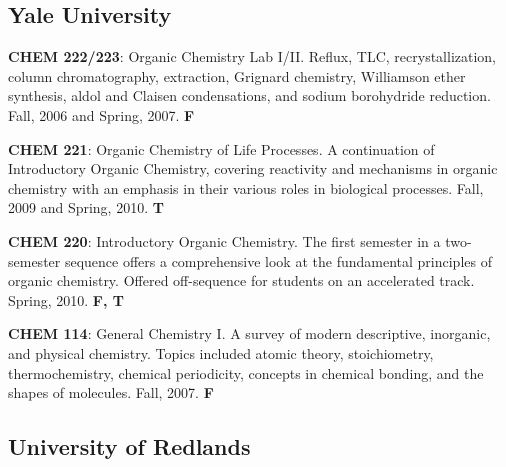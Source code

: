 \documentclass[10pt]{article}
\newcommand*\teitem[4]{\textbf{#1}: #2 #3 \textbf{#4}}
\begin{document}

\subsection{Yale University}


\teitem{CHEM 222/223}{Organic Chemistry Lab I/II. Reflux, TLC, recrystallization, column chromatography, extraction, Grignard chemistry, Williamson ether synthesis, aldol and Claisen condensations, and sodium borohydride reduction.}{Fall, 2006 and Spring, 2007.}{F}

\teitem{CHEM 221}{Organic Chemistry of Life Processes. A continuation of  Introductory Organic Chemistry, covering reactivity and mechanisms in organic chemistry with an emphasis in their various roles in biological processes.}{Fall, 2009 and Spring, 2010.}{T}

\teitem{CHEM 220}{Introductory Organic Chemistry. The first semester in a two-semester sequence offers a comprehensive look at the fundamental principles of organic chemistry. Offered off-sequence for students on an accelerated track.}{Spring, 2010.}{F, T}

\teitem{CHEM 114}{General Chemistry I. A survey of modern descriptive, inorganic, and physical chemistry. Topics included atomic theory, stoichiometry, thermochemistry, chemical periodicity, concepts in chemical bonding, and the shapes of molecules.}{Fall, 2007.}{F}


\subsection{University of Redlands}
\end{document}
